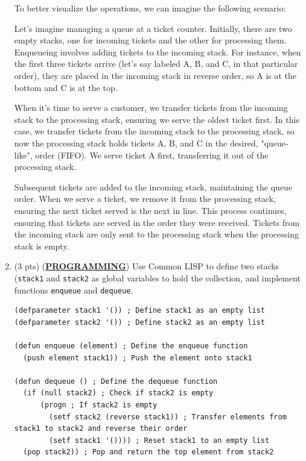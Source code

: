 \documentclass[12pt]{article}
\begin{document}
\begin{spacing}{1.5}
\begin{enumerate}
		      To better visualize the operations, we can imagine the following scenario:
		      		      		      
		      Let's imagine managing a queue at a ticket counter. Initially, there are two empty stacks, one for incoming tickets and the other for processing them. Enqueueing involves adding tickets to the incoming stack. For instance, when the first three tickets arrive (let's say labeled A, B, and C, in that particular order), they are placed in the incoming stack in reverse order, so A is at the bottom and C is at the top.
		      		      		              
		      When it's time to serve a customer, we transfer tickets from the incoming stack to the processing stack, ensuring we serve the oldest ticket first. In this case, we transfer tickets from the incoming stack to the processing stack, so now the processing stack holds tickets A, B, and C in the desired, "queue-like", order (FIFO). We serve ticket A first, transferring it out of the processing stack.
		      		      		              
		      Subsequent tickets are added to the incoming stack, maintaining the queue order. When we serve a ticket, we remove it from the processing stack, ensuring the next ticket served is the next in line. This process continues, ensuring that tickets are served in the order they were received. Tickets from the incoming stack are only sent to the processing stack when the processing stack is empty.
		      		      		      
		\item (3 pts) (\textbf{\uline{PROGRAMMING}}) Use Common LISP to define two stacks (\texttt{stack1} and \texttt{stack2} as global variables to hold the collection, and implement functions \texttt{enqueue} and \texttt{dequeue}.
		      		      		      
		      \begin{lstlisting}
(defparameter stack1 '()) ; Define stack1 as an empty list
(defparameter stack2 '()) ; Define stack2 as an empty list

(defun enqueue (element) ; Define the enqueue function
  (push element stack1)) ; Push the element onto stack1

(defun dequeue () ; Define the dequeue function
  (if (null stack2) ; Check if stack2 is empty
      (progn ; If stack2 is empty
        (setf stack2 (reverse stack1)) ; Transfer elements from stack1 to stack2 and reverse their order
        (setf stack1 '()))) ; Reset stack1 to an empty list
  (pop stack2)) ; Pop and return the top element from stack2


\end{lstlisting}
\end{enumerate}
\end{spacing}
\end{document}
